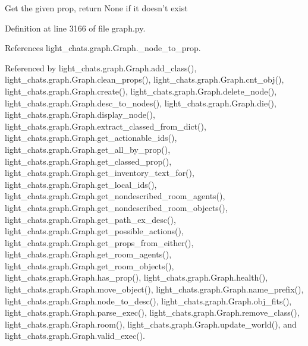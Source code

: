 \begin{DoxyVerb}Get the given prop, return None if it doesn't exist\end{DoxyVerb}
 

Definition at line 3166 of file graph.\+py.



References light\+\_\+chats.\+graph.\+Graph.\+\_\+node\+\_\+to\+\_\+prop.



Referenced by light\+\_\+chats.\+graph.\+Graph.\+add\+\_\+class(), light\+\_\+chats.\+graph.\+Graph.\+clean\+\_\+props(), light\+\_\+chats.\+graph.\+Graph.\+cnt\+\_\+obj(), light\+\_\+chats.\+graph.\+Graph.\+create(), light\+\_\+chats.\+graph.\+Graph.\+delete\+\_\+node(), light\+\_\+chats.\+graph.\+Graph.\+desc\+\_\+to\+\_\+nodes(), light\+\_\+chats.\+graph.\+Graph.\+die(), light\+\_\+chats.\+graph.\+Graph.\+display\+\_\+node(), light\+\_\+chats.\+graph.\+Graph.\+extract\+\_\+classed\+\_\+from\+\_\+dict(), light\+\_\+chats.\+graph.\+Graph.\+get\+\_\+actionable\+\_\+ids(), light\+\_\+chats.\+graph.\+Graph.\+get\+\_\+all\+\_\+by\+\_\+prop(), light\+\_\+chats.\+graph.\+Graph.\+get\+\_\+classed\+\_\+prop(), light\+\_\+chats.\+graph.\+Graph.\+get\+\_\+inventory\+\_\+text\+\_\+for(), light\+\_\+chats.\+graph.\+Graph.\+get\+\_\+local\+\_\+ids(), light\+\_\+chats.\+graph.\+Graph.\+get\+\_\+nondescribed\+\_\+room\+\_\+agents(), light\+\_\+chats.\+graph.\+Graph.\+get\+\_\+nondescribed\+\_\+room\+\_\+objects(), light\+\_\+chats.\+graph.\+Graph.\+get\+\_\+path\+\_\+ex\+\_\+desc(), light\+\_\+chats.\+graph.\+Graph.\+get\+\_\+possible\+\_\+actions(), light\+\_\+chats.\+graph.\+Graph.\+get\+\_\+props\+\_\+from\+\_\+either(), light\+\_\+chats.\+graph.\+Graph.\+get\+\_\+room\+\_\+agents(), light\+\_\+chats.\+graph.\+Graph.\+get\+\_\+room\+\_\+objects(), light\+\_\+chats.\+graph.\+Graph.\+has\+\_\+prop(), light\+\_\+chats.\+graph.\+Graph.\+health(), light\+\_\+chats.\+graph.\+Graph.\+move\+\_\+object(), light\+\_\+chats.\+graph.\+Graph.\+name\+\_\+prefix(), light\+\_\+chats.\+graph.\+Graph.\+node\+\_\+to\+\_\+desc(), light\+\_\+chats.\+graph.\+Graph.\+obj\+\_\+fits(), light\+\_\+chats.\+graph.\+Graph.\+parse\+\_\+exec(), light\+\_\+chats.\+graph.\+Graph.\+remove\+\_\+class(), light\+\_\+chats.\+graph.\+Graph.\+room(), light\+\_\+chats.\+graph.\+Graph.\+update\+\_\+world(), and light\+\_\+chats.\+graph.\+Graph.\+valid\+\_\+exec().

